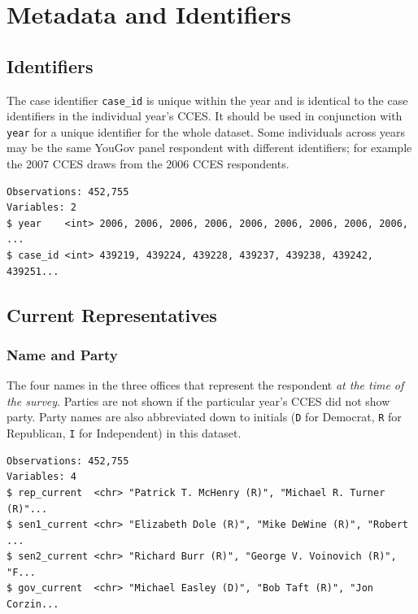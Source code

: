 \documentclass[10pt,article,oneside]{memoir}
\theoremstyle{definition}
\begin{document}
\newpage

\section{Metadata and Identifiers}\label{metadata-and-identifiers}

\subsection{Identifiers}\label{identifiers}

The case identifier \texttt{case\_id} is unique within the year and is
identical to the case identifiers in the individual year's CCES. It
should be used in conjunction with \texttt{year} for a unique identifier
for the whole dataset. Some individuals across years may be the same
YouGov panel respondent with different identifiers; for example the 2007
CCES draws from the 2006 CCES respondents.

\begin{verbatim}
Observations: 452,755
Variables: 2
$ year    <int> 2006, 2006, 2006, 2006, 2006, 2006, 2006, 2006, 2006, ...
$ case_id <int> 439219, 439224, 439228, 439237, 439238, 439242, 439251...
\end{verbatim}

\subsection{Current Representatives}\label{current-representatives}

\subsubsection{Name and Party}\label{name-and-party}

The four names in the three offices that represent the respondent
\emph{at the time of the survey}. Parties are not shown if the
particular year's CCES did not show party. Party names are also
abbreviated down to initials (\texttt{D} for Democrat, \texttt{R} for
Republican, \texttt{I} for Independent) in this dataset.

\begin{verbatim}
Observations: 452,755
Variables: 4
$ rep_current  <chr> "Patrick T. McHenry (R)", "Michael R. Turner (R)"...
$ sen1_current <chr> "Elizabeth Dole (R)", "Mike DeWine (R)", "Robert ...
$ sen2_current <chr> "Richard Burr (R)", "George V. Voinovich (R)", "F...
$ gov_current  <chr> "Michael Easley (D)", "Bob Taft (R)", "Jon Corzin...
\end{verbatim}
\end{document}
